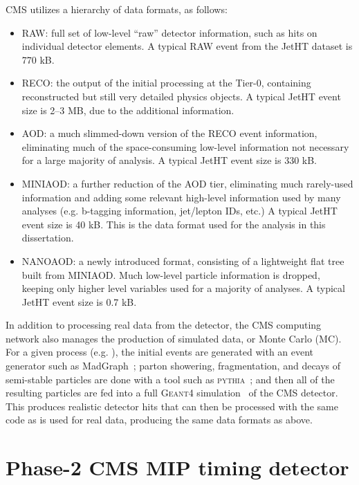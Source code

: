 CMS utilizes a hierarchy of data formats, as follows:
\vspace{-2mm}
\begin{itemize}\setlength\itemsep{-1mm}
\item {RAW}: full set of low-level ``raw'' detector information, such as hits on individual detector elements.
A typical {RAW} event from the JetHT dataset is 770 kB.
\item {RECO}: the output of the initial processing at the Tier-0, containing reconstructed but still very detailed physics objects.
A typical JetHT event size is 2--3 MB, due to the additional information.
\item {AOD}: a much slimmed-down version of the {RECO} event information, eliminating much of
the space-consuming low-level information not necessary for a large majority of analysis. A typical JetHT event
size is 330 kB.
\item {MINIAOD}: a further reduction of the {AOD} tier, eliminating much rarely-used information
and adding some relevant high-level information used by many analyses (e.g. b-tagging information, jet/lepton IDs, etc.)
A typical JetHT event size is 40 kB. This is the data format used for the analysis in this dissertation.
\item NANOAOD: a newly introduced format, consisting of a lightweight flat tree built from MINIAOD. Much low-level
particle information is dropped, keeping only higher level variables used for a majority of analyses.
A typical JetHT event size is 0.7 kB.
\end{itemize}

In addition to processing real data from the detector, the CMS computing network also manages the production
of simulated data, or Monte Carlo (MC). For a given process (e.g. \zll), the initial events
are generated with an event generator such as MadGraph~\cite{madgraph}; parton showering, fragmentation, and decays
of semi-stable particles are done with a tool such as \textsc{pythia}~\cite{pythia}; and then all of the resulting
particles are fed into a full \textsc{Geant4} simulation~\cite{geant4} of the CMS detector. This produces
realistic detector hits that can then be processed with the same code as is used for real data,
producing the same data formats as above.

\section{Phase-2 CMS MIP timing detector}

